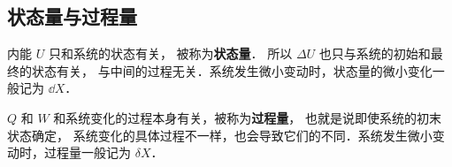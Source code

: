 \subsection{状态量与过程量}
内能 $U$ 只和系统的状态有关， 被称为\textbf{状态量}． 所以 $\Delta U$ 也只与系统的初始和最终的状态有关， 与中间的过程无关．系统发生微小变动时，状态量的微小变化一般记为 $\dd X$．

$Q$ 和 $W$ 和系统变化的过程本身有关，被称为\textbf{过程量}， 也就是说即使系统的初末状态确定， 系统变化的具体过程不一样，也会导致它们的不同．系统发生微小变动时，过程量一般记为 $\delta X$．



